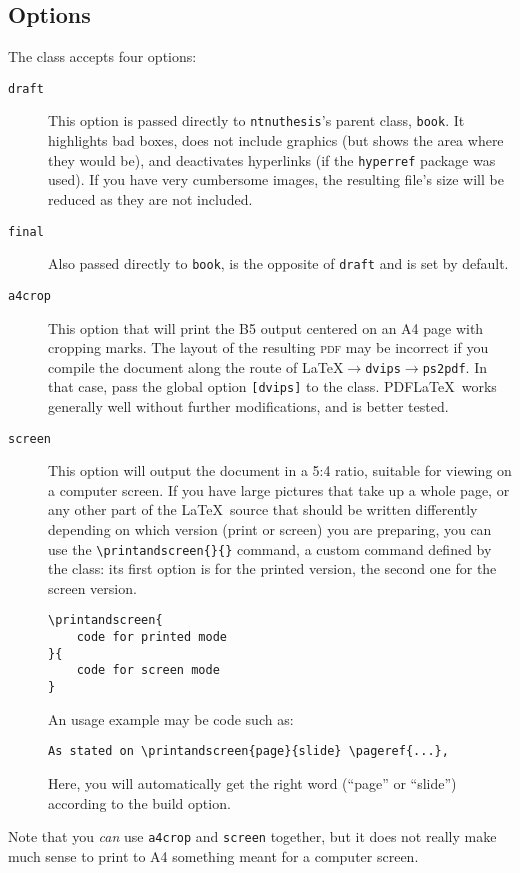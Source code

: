 \documentclass[a4paper,10pt]{article}
\begin{document}
\subsection*{Options}
The class accepts four options:
\begin{description}
\item[\texttt{draft}] This option is passed directly to \texttt{ntnuthesis}'s parent class, \texttt{book}. It highlights bad boxes, does not include graphics (but shows the area where they would be), and deactivates hyperlinks (if the \texttt{hyperref} package was used). If you have very cumbersome images, the resulting file's size will be reduced as they are not included.
\item[\texttt{final}] Also passed directly to \texttt{book}, is the opposite of \texttt{draft} and is set by default.
\item[\texttt{a4crop}] This option that will print the B5 output centered on an A4 page with cropping marks. The layout of the resulting \textsc{pdf} may be incorrect if you compile the document along the route of \LaTeX$\rightarrow$\texttt{dvips}$\rightarrow$\texttt{ps2pdf}. In that case, pass the global option \texttt{[dvips]} to the class. PDF\LaTeX\ works generally well without further modifications, and is better tested.
\item[\texttt{screen}] This option will output the document in a 5:4 ratio, suitable for viewing on a computer screen. If you have large pictures that take up a whole page, or any other part of the \LaTeX\ source that should be written differently depending on which version (print or screen) you are preparing, you can use the \verb|\printandscreen{}{}| command, a custom command defined by the class: its first option is for the printed version, the second one for the screen version.
\begin{verbatim}
\printandscreen{
    code for printed mode
}{
    code for screen mode
}
\end{verbatim}
An usage example may be code such as:
\begin{verbatim}
As stated on \printandscreen{page}{slide} \pageref{...},
\end{verbatim}
Here, you will automatically get the right word (``page'' or ``slide'') according to the build option.
\end{description}

Note that you \emph{can} use \texttt{a4crop} and \texttt{screen} together, but it does not really make much sense to print to A4 something meant for a computer screen.
\end{document}
